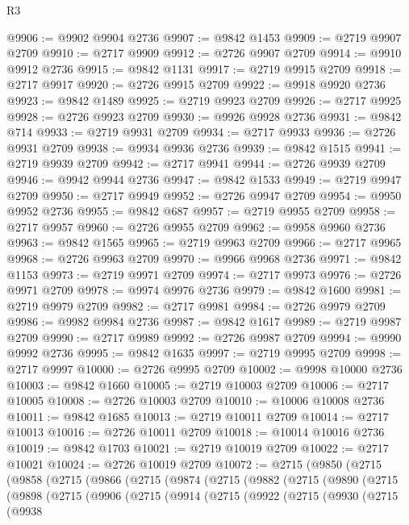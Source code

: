 \begin{lexlean}{R3}
\begin{coremodule}
@9906 := @9902 @9904 @2736
@9907 := @9842 @1453
@9909 := @2719 @9907 @2709
@9910 := @2717 @9909
@9912 := @2726 @9907 @2709
@9914 := @9910 @9912 @2736
@9915 := @9842 @1131
@9917 := @2719 @9915 @2709
@9918 := @2717 @9917
@9920 := @2726 @9915 @2709
@9922 := @9918 @9920 @2736
@9923 := @9842 @1489
@9925 := @2719 @9923 @2709
@9926 := @2717 @9925
@9928 := @2726 @9923 @2709
@9930 := @9926 @9928 @2736
@9931 := @9842 @714
@9933 := @2719 @9931 @2709
@9934 := @2717 @9933
@9936 := @2726 @9931 @2709
@9938 := @9934 @9936 @2736
@9939 := @9842 @1515
@9941 := @2719 @9939 @2709
@9942 := @2717 @9941
@9944 := @2726 @9939 @2709
@9946 := @9942 @9944 @2736
@9947 := @9842 @1533
@9949 := @2719 @9947 @2709
@9950 := @2717 @9949
@9952 := @2726 @9947 @2709
@9954 := @9950 @9952 @2736
@9955 := @9842 @687
@9957 := @2719 @9955 @2709
@9958 := @2717 @9957
@9960 := @2726 @9955 @2709
@9962 := @9958 @9960 @2736
@9963 := @9842 @1565
@9965 := @2719 @9963 @2709
@9966 := @2717 @9965
@9968 := @2726 @9963 @2709
@9970 := @9966 @9968 @2736
@9971 := @9842 @1153
@9973 := @2719 @9971 @2709
@9974 := @2717 @9973
@9976 := @2726 @9971 @2709
@9978 := @9974 @9976 @2736
@9979 := @9842 @1600
@9981 := @2719 @9979 @2709
@9982 := @2717 @9981
@9984 := @2726 @9979 @2709
@9986 := @9982 @9984 @2736
@9987 := @9842 @1617
@9989 := @2719 @9987 @2709
@9990 := @2717 @9989
@9992 := @2726 @9987 @2709
@9994 := @9990 @9992 @2736
@9995 := @9842 @1635
@9997 := @2719 @9995 @2709
@9998 := @2717 @9997
@10000 := @2726 @9995 @2709
@10002 := @9998 @10000 @2736
@10003 := @9842 @1660
@10005 := @2719 @10003 @2709
@10006 := @2717 @10005
@10008 := @2726 @10003 @2709
@10010 := @10006 @10008 @2736
@10011 := @9842 @1685
@10013 := @2719 @10011 @2709
@10014 := @2717 @10013
@10016 := @2726 @10011 @2709
@10018 := @10014 @10016 @2736
@10019 := @9842 @1703
@10021 := @2719 @10019 @2709
@10022 := @2717 @10021
@10024 := @2726 @10019 @2709
@10072 := @2715
    (@9850
      (@2715
        (@9858
          (@2715
            (@9866
              (@2715
                (@9874
                  (@2715
                    (@9882
                      (@2715
                        (@9890
                          (@2715
                            (@9898
                              (@2715
                                (@9906
                                  (@2715
                                    (@9914
                                      (@2715
                                        (@9922
                                          (@2715
                                            (@9930
                                              (@2715
                                                (@9938

\end{coremodule}
\end{lexlean}
